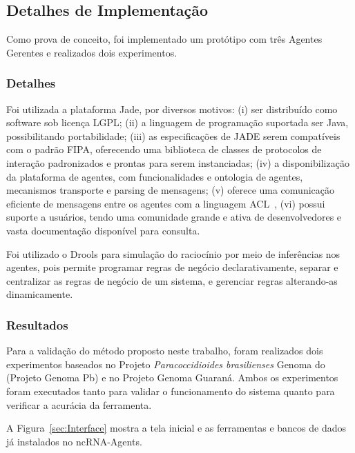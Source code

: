 \subsection{Detalhes de Implementa\c{c}\~ao} \label{sec:Implemetacao}

Como prova de conceito, foi implementado um prot\'otipo com tr\^es Agentes Gerentes e realizados dois experimentos. 

\subsubsection{Detalhes}


Foi utilizada a plataforma Jade, por diversos motivos: (i) ser distribu\'ido como software sob licen\c{c}a LGPL; (ii) a linguagem de programa\c{c}\~ao suportada ser Java, possibilitando portabilidade; (iii) as especifica\c{c}\~oes de JADE serem compat\'iveis com o padr\~ao FIPA, oferecendo uma biblioteca de classes de protocolos  de intera\c{c}\~ao padronizados e prontas para serem instanciadas; (iv) a disponibiliza\c{c}\~ao da plataforma de agentes, com funcionalidades e ontologia de agentes,  mecanismos transporte e parsing de mensagens; (v) oferece uma comunica\c{c}\~ao eficiente de mensagens entre os agentes com a linguagem ACL~\citep{fipa:2002}, (vi) possui suporte a usu\'arios, tendo uma comunidade grande e ativa de desenvolvedores e vasta documenta\c{c}\~ao dispon\'ivel para consulta.

Foi utilizado o Drools para simula\c{c}\~ao do racioc\'inio por meio de infer\^encias nos agentes, pois permite programar regras de neg\'ocio declarativamente, separar e centralizar as regras de neg\'ocio de um sistema, e gerenciar regras alterando-as dinamicamente.


\subsubsection{Resultados} \label{sec:ResultadosObtidos}

Para a validação do método proposto neste trabalho, foram realizados dois experimentos baseados no Projeto \textit{Paracoccidioides brasilienses} Genoma do (Projeto Genoma Pb) e no Projeto Genoma Guaraná. Ambos os experimentos foram executados tanto para validar o funcionamento do sistema quanto para verificar a acurácia da ferramenta.


A Figura~\ref{sec:Interface} mostra a tela inicial e as ferramentas e bancos de dados já instalados no ncRNA-Agents.

